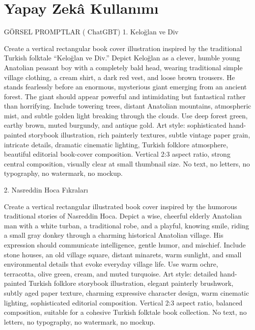 \documentclass[12pt,a4paper]{article}
\begin{document}
\section{Yapay Zekâ Kullanımı}
GÖRSEL PROMPTLAR ( ChatGBT)
1. Keloğlan ve Div
 
Create a vertical rectangular book cover illustration inspired by the traditional Turkish folktale “Keloğlan ve Div.” Depict Keloğlan as a clever, humble young Anatolian peasant boy with a completely bald head, wearing traditional simple village clothing, a cream shirt, a dark red vest, and loose brown trousers. He stands fearlessly before an enormous, mysterious giant emerging from an ancient forest. The giant should appear powerful and intimidating but fantastical rather than horrifying. Include towering trees, distant Anatolian mountains, atmospheric mist, and subtle golden light breaking through the clouds. Use deep forest green, earthy brown, muted burgundy, and antique gold. Art style: sophisticated hand-painted storybook illustration, rich painterly textures, subtle vintage paper grain, intricate details, dramatic cinematic lighting, Turkish folklore atmosphere, beautiful editorial book-cover composition. Vertical 2:3 aspect ratio, strong central composition, visually clear at small thumbnail size. No text, no letters, no typography, no watermark, no mockup.

2. Nasreddin Hoca Fıkraları
 
Create a vertical rectangular illustrated book cover inspired by the humorous traditional stories of Nasreddin Hoca. Depict a wise, cheerful elderly Anatolian man with a white turban, a traditional robe, and a playful, knowing smile, riding a small gray donkey through a charming historical Anatolian village. His expression should communicate intelligence, gentle humor, and mischief. Include stone houses, an old village square, distant minarets, warm sunlight, and small environmental details that evoke everyday village life. Use warm ochre, terracotta, olive green, cream, and muted turquoise. Art style: detailed hand-painted Turkish folklore storybook illustration, elegant painterly brushwork, subtly aged paper texture, charming expressive character design, warm cinematic lighting, sophisticated editorial composition. Vertical 2:3 aspect ratio, balanced composition, suitable for a cohesive Turkish folktale book collection. No text, no letters, no typography, no watermark, no mockup.
\end{document}
